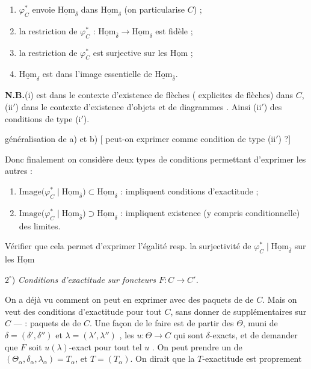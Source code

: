 \documentclass[11pt,a4paper]{article}
\begin{document}
\begin{enumerate}
  \item[(i)] $\varphi^{*}_C$ envoie $\underline{\mathrm{Hom}}_{\bar\delta}$ dans
    $\underline{\mathrm{Hom}}_{\delta}$ (on particularise \ill{} $C$) ;
  \item[(i$'$)] \struck{\ill{}} la restriction de $\varphi^{*}_C$ :
    $\underline{\mathrm{Hom}}_{\bar\delta} \to \underline{\mathrm{Hom}}_{\delta}$
    est fidèle ;
  \item[(ii)] \struck{\ill{}} la restriction de $\varphi^{*}_C$ est surjective
    sur les $\underline{\mathrm{Hom}}$ ;
  \item[(ii$'$)] \struck{\ill{}} $\underline{\mathrm{Hom}}_{\delta}$ est dans
    l'image essentielle de $\underline{\mathrm{Hom}}_{\bar\delta}$.
\end{enumerate}

\textbf{N.B.}\quad (i)  est dans le contexte   d'existence de flèches (\ill{} explicites de flèches) dans
$C$,  (ii$'$) dans le contexte d'existence d'objets et de diagrammes
\ill{}. Ainsi (ii$'$)   \ill{} des conditions de type
(i$'$).

\ill{} généralisation de a) et b) [ \ill{} peut-on 
exprimer \ill{} comme condition de type (ii$'$) ?]

Donc finalement on considère deux types de conditions permettant d'exprimer les
autres :
\begin{enumerate}
  \item[$1^{\circ}$)] \struck{\ill{}}
    $\mathrm{Image}\bigl(\varphi^{*}_C \mid \underline{\mathrm{Hom}}_{\bar\delta}\bigr)
    \subset \underline{\mathrm{Hom}}_{\delta}$ : impliquent conditions
    d'exactitude  ;
  \item[$2^{\circ}$)]
    $\mathrm{Image}\bigl(\varphi^{*}_C \mid \underline{\mathrm{Hom}}_{\bar\delta}\bigr)
    \supset \underline{\mathrm{Hom}}_{\delta}$ : impliquent 
    existence (y compris conditionnelle) des limites.
\end{enumerate}
Vérifier que cela permet d'exprimer l'égalité \ill{} resp. la surjectivité de
$\varphi^{*}_C \mid \underline{\mathrm{Hom}}_{\bar\delta}$ sur les
$\underline{\mathrm{Hom}}$ \ill{}

$2^{\circ}$) \emph{Conditions d'exactitude sur  foncteurs
$F : C \to C'$.}

On a déjà vu comment on peut en exprimer avec des paquets de
  de $C$. Mais on veut des conditions
d'exactitude \ill{} pour tout $C$, sans donner de \struck{\ill{}}
supplémentaires sur $C$ — \ill{} :  \ill{} paquets de
  de $C$. Une façon de le faire est de partir des
$\Theta$, muni de $\delta = (\delta',\delta'')$ et
$\lambda = (\lambda',\lambda'')$ , \ill{} les
$u : \Theta \to C$ qui sont $\delta$-exacts, et de demander que $F$ soit
$u(\lambda)$-exact pour tout tel $u$ \struck{\ill{}}. On peut prendre un \ill{}
de \struck{\ill{}} $(\Theta_\alpha, \delta_\alpha, \lambda_\alpha) = T_\alpha$,
et $T = (T_\alpha)$. On dirait que \struck{\ill{}} la $T$-exactitude est
proprement \ill{}
\end{document}
